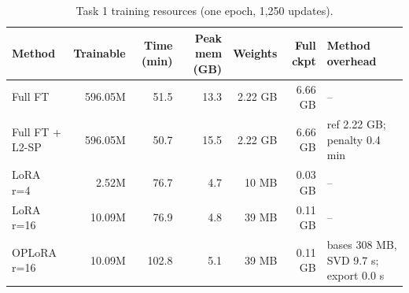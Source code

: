 \begin{table}[t]
\centering
\scriptsize
\begin{tabular}{lrrrrrl}
\toprule
Method & Trainable & Time (min) & Peak mem (GB) & Weights & Full ckpt & Method overhead \\
\midrule
Full FT & 596.05M & 51.5 & 13.3 & 2.22 GB & 6.66 GB & -- \\
Full FT + L2-SP & 596.05M & 50.7 & 15.5 & 2.22 GB & 6.66 GB & ref 2.22 GB; penalty 0.4 min \\
LoRA r=4 & 2.52M & 76.7 & 4.7 & 10 MB & 0.03 GB & -- \\
LoRA r=16 & 10.09M & 76.9 & 4.8 & 39 MB & 0.11 GB & -- \\
OPLoRA r=16 & 10.09M & 102.8 & 5.1 & 39 MB & 0.11 GB & bases 308 MB, SVD 9.7 s; export 0.0 s \\
\bottomrule
\end{tabular}
\caption{Task 1 training resources (one epoch, 1,250 updates).}
\label{tab:t1-resources}
\end{table}
